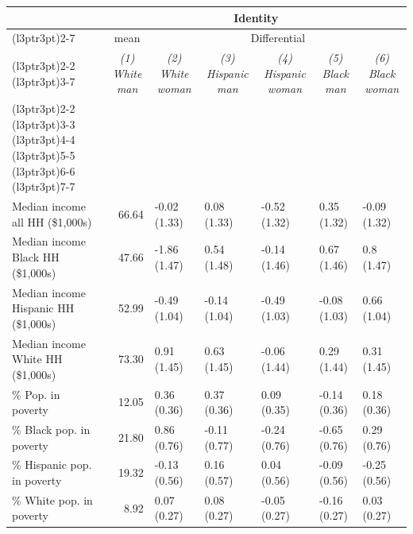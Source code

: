 \begin{table}
\centering
\begin{tabular}[t]{lrlllll}
\toprule
\multicolumn{1}{c}{ } & \multicolumn{6}{c}{Identity} \\
\cmidrule(l{3pt}r{3pt}){2-7}
\multicolumn{1}{c}{ } & \multicolumn{1}{c}{mean} & \multicolumn{5}{c}{Differential} \\
\cmidrule(l{3pt}r{3pt}){2-2} \cmidrule(l{3pt}r{3pt}){3-7}
\multicolumn{1}{c}{\em{}} & \multicolumn{1}{c}{\em{(1) White man}} & \multicolumn{1}{c}{\em{(2) White woman}} & \multicolumn{1}{c}{\em{(3) Hispanic man}} & \multicolumn{1}{c}{\em{(4) Hispanic woman}} & \multicolumn{1}{c}{\em{(5) Black man}} & \multicolumn{1}{c}{\em{(6) Black woman}} \\
\cmidrule(l{3pt}r{3pt}){2-2} \cmidrule(l{3pt}r{3pt}){3-3} \cmidrule(l{3pt}r{3pt}){4-4} \cmidrule(l{3pt}r{3pt}){5-5} \cmidrule(l{3pt}r{3pt}){6-6} \cmidrule(l{3pt}r{3pt}){7-7}
\addlinespace[0.3em]
\multicolumn{7}{l}{\textbf{Income (county-level)}}\\
\hspace{1em}Median income all HH (\$1,000s) & 66.64 & -0.02 (1.33) & 0.08 (1.33) & -0.52 (1.32) & 0.35 (1.32) & -0.09 (1.32)\\
\hspace{1em}Median income Black HH (\$1,000s) & 47.66 & -1.86 (1.47) & 0.54 (1.48) & -0.14 (1.46) & 0.67 (1.46) & 0.8 (1.47)\\
\hspace{1em}Median income Hispanic HH (\$1,000s) & 52.99 & -0.49 (1.04) & -0.14 (1.04) & -0.49 (1.03) & -0.08 (1.03) & 0.66 (1.04)\\
\hspace{1em}Median income White HH (\$1,000s) & 73.30 & 0.91 (1.45) & 0.63 (1.45) & -0.06 (1.44) & 0.29 (1.44) & 0.31 (1.45)\\
\hspace{1em}\% Pop. in poverty & 12.05 & 0.36 (0.36) & 0.37 (0.36) & 0.09 (0.35) & -0.14 (0.36) & 0.18 (0.36)\\
\hspace{1em}\% Black pop. in poverty & 21.80 & 0.86 (0.76) & -0.11 (0.77) & -0.24 (0.76) & -0.65 (0.76) & 0.29 (0.76)\\
\hspace{1em}\% Hispanic pop. in poverty & 19.32 & -0.13 (0.56) & 0.16 (0.57) & 0.04 (0.56) & -0.09 (0.56) & -0.25 (0.56)\\
\hspace{1em}\% White pop. in poverty & 8.92 & 0.07 (0.27) & 0.08 (0.27) & -0.05 (0.27) & -0.16 (0.27) & 0.03 (0.27)\\

\end{tabular}
\end{table}
